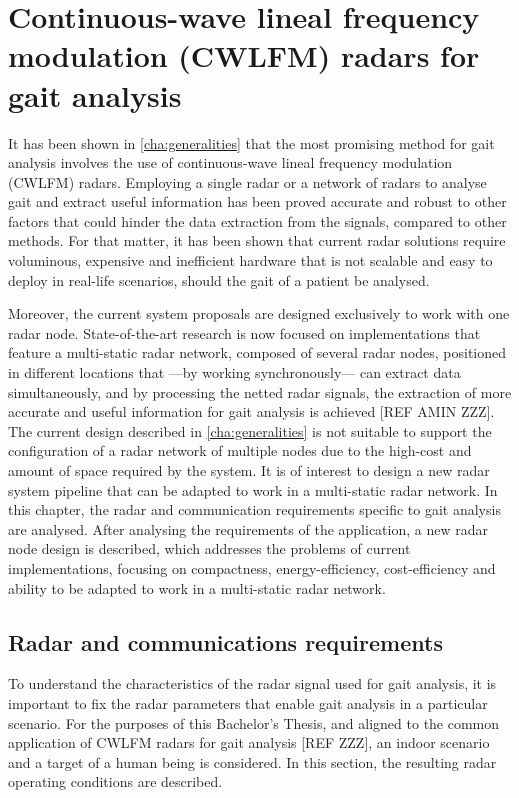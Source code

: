 \chapter{Continuous-wave lineal frequency modulation (CWLFM) radars for gait analysis}

It has been shown in \cref{cha:generalities} that the most promising method for gait analysis involves the use of continuous-wave lineal frequency modulation (CWLFM) radars. Employing a single radar or a network of radars to analyse gait and extract useful information has been proved accurate and robust to other factors that could hinder the data extraction from the signals, compared to other methods. For that matter, it has been shown that current radar solutions require voluminous, expensive and inefficient hardware that is not scalable and easy to deploy in real-life scenarios, should the gait of a patient be analysed.

Moreover, the current system proposals are designed exclusively to work with one radar node. State-of-the-art research is now focused on implementations that feature a multi-static radar network, composed of several radar nodes, positioned in different locations that ---by working synchronously--- can extract data simultaneously, and by processing the netted radar signals, the extraction of more accurate and useful information for gait analysis is achieved [REF AMIN ZZZ]. The current design described in \cref{cha:generalities} is not suitable to support the configuration of a radar network of multiple nodes due to the high-cost and amount of space required by the system. It is of interest to design a new radar system pipeline that can be adapted to work in a multi-static radar network. In this chapter, the radar and communication requirements specific to gait analysis are analysed. After analysing the requirements of the application, a new radar node design is described, which addresses the problems of current implementations, focusing on compactness, energy-efficiency, cost-efficiency and ability to be adapted to work in a multi-static radar network.

\section{Radar and communications requirements}

To understand the characteristics of the radar signal used for gait analysis, it is important to fix the radar parameters that enable gait analysis in a particular scenario. For the purposes of this Bachelor's Thesis, and aligned to the common application of CWLFM radars for gait analysis [REF ZZZ], an indoor scenario and a target of a human being is considered. In this section, the resulting radar operating conditions are described.

